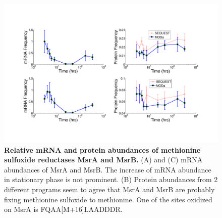 \documentclass[12pt]{article}
\begin{document}
\clearpage
\begin{figure}[p]
\centerline{\includegraphics[width=8in]{Figures/MsrAB_mRNA_protein.pdf}}
\caption{\label{fig:MsrAB}\textbf{Relative mRNA and protein abundances of methionine sulfoxide reductases MsrA and MsrB.} (A) and (C) mRNA abundances of MsrA and MsrB. The increase of mRNA abundance in stationary phase is not prominent. (B) Protein abundances from 2 different programs seem to agree that MsrA and MsrB are probably fixing methionine sulfoxide to methionine. One of the sites oxidized on MsrA is FQAA[M+16]LAADDDR.}
\end{figure}

\bigskip
\end{document}

